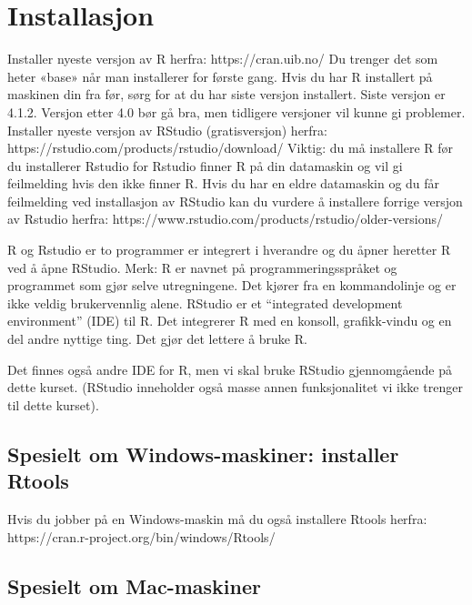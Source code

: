 \documentclass[
  letterpaper,
  DIV=11,
  numbers=noendperiod]{scrreprt}
\theoremstyle{definition}
\theoremstyle{remark}
\begin{document}
\hypertarget{installasjon}{%
\section{Installasjon}\label{installasjon}}

Installer nyeste versjon av R herfra: https://cran.uib.no/ Du trenger
det som heter «base» når man installerer for første gang. Hvis du har R
installert på maskinen din fra før, sørg for at du har siste versjon
installert. Siste versjon er 4.1.2. Versjon etter 4.0 bør gå bra, men
tidligere versjoner vil kunne gi problemer. Installer nyeste versjon av
RStudio (gratisversjon) herfra:
https://rstudio.com/products/rstudio/download/ Viktig: du må installere
R før du installerer Rstudio for Rstudio finner R på din datamaskin og
vil gi feilmelding hvis den ikke finner R. Hvis du har en eldre
datamaskin og du får feilmelding ved installasjon av RStudio kan du
vurdere å installere forrige versjon av Rstudio herfra:
https://www.rstudio.com/products/rstudio/older-versions/

R og Rstudio er to programmer er integrert i hverandre og du åpner
heretter R ved å åpne RStudio. Merk: R er navnet på
programmeringsspråket og programmet som gjør selve utregningene. Det
kjører fra en kommandolinje og er ikke veldig brukervennlig alene.
RStudio er et ``integrated development environment'' (IDE) til R. Det
integrerer R med en konsoll, grafikk-vindu og en del andre nyttige ting.
Det gjør det lettere å bruke R.

Det finnes også andre IDE for R, men vi skal bruke RStudio gjennomgående
på dette kurset. (RStudio inneholder også masse annen funksjonalitet vi
ikke trenger til dette kurset).

\hypertarget{spesielt-om-windows-maskiner-installer-rtools}{%
\subsection{Spesielt om Windows-maskiner: installer
Rtools}\label{spesielt-om-windows-maskiner-installer-rtools}}

Hvis du jobber på en Windows-maskin må du også installere Rtools herfra:
https://cran.r-project.org/bin/windows/Rtools/

\hypertarget{spesielt-om-mac-maskiner}{%
\subsection{Spesielt om Mac-maskiner}\label{spesielt-om-mac-maskiner}}
\end{document}
